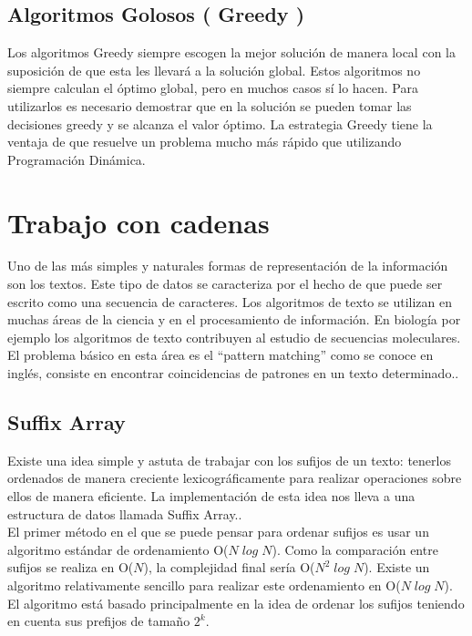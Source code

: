 \documentclass{report}
\begin{document}
\subsection{Algoritmos Golosos ( Greedy )}
Los algoritmos Greedy siempre escogen la mejor soluci\'on de manera local con la suposici\'on de
que esta les llevar\'a a la soluci\'on global\cite{Cormen}\cite{Halim}. Estos algoritmos no siempre calculan el \'optimo global,
pero en muchos casos s\'i lo hacen. Para utilizarlos es necesario demostrar que en la soluci\'on se
pueden tomar las decisiones greedy y se alcanza el valor \'optimo. La estrategia Greedy tiene la
ventaja de que resuelve un problema mucho m\'as r\'apido que utilizando Programaci\'on Din\'amica.

\section{Trabajo con cadenas}
Uno de las m\'as simples y naturales formas de representaci\'on de la informaci\'on son los textos. Este tipo de datos se caracteriza por el hecho de que puede ser escrito como una secuencia de caracteres. Los algoritmos de texto se utilizan en muchas \'areas de la ciencia y en el procesamiento de informaci\'on. En biolog\'ia por ejemplo los algoritmos de texto contribuyen al estudio de secuencias moleculares. El problema b\'asico en esta \'area es el ``pattern matching'' como se conoce en ingl\'es, consiste en encontrar coincidencias de patrones en un texto determinado.\cite{TextAlgorithm}\cite{Halim}.\\
\subsection{Suffix Array}
Existe una idea simple y astuta de trabajar con los sufijos de un texto: tenerlos ordenados de manera creciente lexicogr\'aficamente para realizar operaciones sobre ellos de manera eficiente. La implementaci\'on de esta idea nos lleva a una estructura de datos llamada Suffix Array.\cite{TextAlgorithm}.\\
El primer m\'etodo en el que se puede pensar para ordenar sufijos es usar un algoritmo est\'andar de ordenamiento O($N \;log\; N$). Como la comparaci\'on entre sufijos se realiza en O($N$), la complejidad final ser\'ia O($N^2 \;log\;N$). Existe un algoritmo relativamente sencillo para realizar este ordenamiento en O($N\;log\;N$). El algoritmo est\'a basado principalmente en la idea de ordenar los sufijos teniendo en cuenta sus prefijos de tama\~no $2^k$\cite{SuffixArray}\cite{SuffixArray1}.
\end{document}
